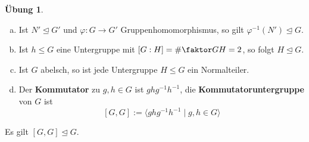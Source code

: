 \documentclass[a4paper]{article}
\theoremstyle{plain}
\theoremstyle{definition}
\newtheorem{ubng}[thm]{Übung}
\begin{document}
\begin{ubng} \item
  \begin{enumerate}[(a)]
          \item Ist $N' \trianglelefteq G'$ und $\varphi : G \to G'$ Gruppenhomomorphismus, so gilt $\varphi^{-1}(N') \trianglelefteq G$.
    \item Ist $h \le G$ eine Untergruppe mit $[G:H] = \# \faktor GH= 2$, so folgt $H \trianglelefteq G$.
    \item Ist $G$ abelsch, so ist jede Untergruppe $H \le G$ ein Normalteiler.
    \item Der \textbf{Kommutator} zu $g, h \in G$ ist $ghg^{-1}h^{-1}$, die \textbf{Kommutatoruntergruppe} von $G$ ist $$[G, G]:= \langle ghg^{-1}h^{-1} \mid g, h \in G \rangle$$
\end{enumerate}
Es gilt $[G, G] \trianglelefteq G.$
\end{ubng}
\end{document}
